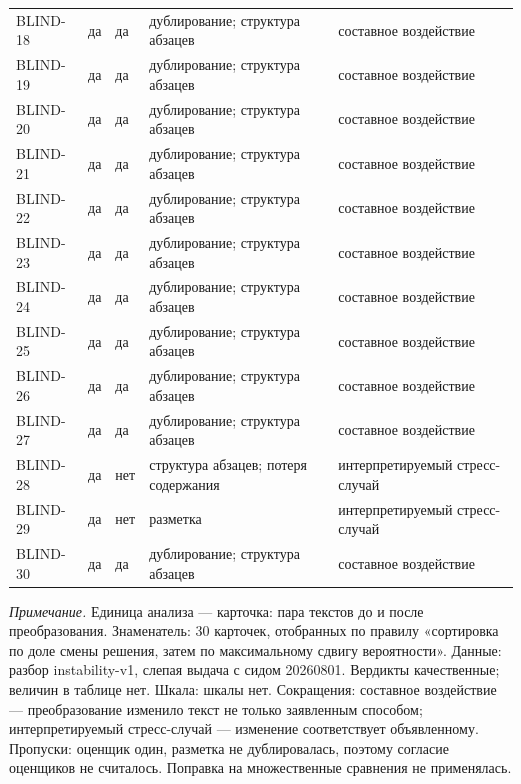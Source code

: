 \begin{longtable}{lllll}
BLIND-18 & да & да & дублирование; структура абзацев & составное воздействие \\
BLIND-19 & да & да & дублирование; структура абзацев & составное воздействие \\
BLIND-20 & да & да & дублирование; структура абзацев & составное воздействие \\
BLIND-21 & да & да & дублирование; структура абзацев & составное воздействие \\
BLIND-22 & да & да & дублирование; структура абзацев & составное воздействие \\
BLIND-23 & да & да & дублирование; структура абзацев & составное воздействие \\
BLIND-24 & да & да & дублирование; структура абзацев & составное воздействие \\
BLIND-25 & да & да & дублирование; структура абзацев & составное воздействие \\
BLIND-26 & да & да & дублирование; структура абзацев & составное воздействие \\
BLIND-27 & да & да & дублирование; структура абзацев & составное воздействие \\
BLIND-28 & да & нет & структура абзацев; потеря содержания & интерпретируемый стресс-случай \\
BLIND-29 & да & нет & разметка & интерпретируемый стресс-случай \\
BLIND-30 & да & да & дублирование; структура абзацев & составное воздействие \\
\end{longtable}
\begin{minipage}{\linewidth}\footnotesize\vspace{2pt}
\textit{Примечание.} Единица анализа — карточка: пара текстов до и после преобразования. Знаменатель: 30 карточек, отобранных по правилу «сортировка по доле смены решения, затем по максимальному сдвигу вероятности». Данные: разбор instability-v1, слепая выдача с сидом 20260801. Вердикты качественные; величин в таблице нет. Шкала: шкалы нет. Сокращения: составное воздействие — преобразование изменило текст не только заявленным способом; интерпретируемый стресс-случай — изменение соответствует объявленному. Пропуски: оценщик один, разметка не дублировалась, поэтому согласие оценщиков не считалось. Поправка на множественные сравнения не применялась.
\end{minipage}
\endgroup
